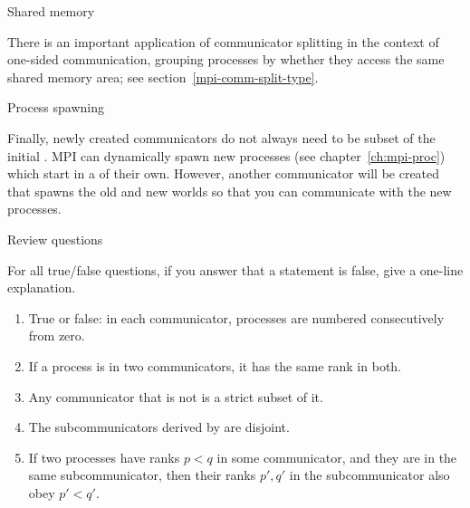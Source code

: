  {Shared memory}

There is an important application of communicator splitting in the
context of one-sided communication, grouping processes by whether they
access the same shared memory area; see section~\ref{mpi-comm-split-type}.

 {Process spawning}

Finally, newly created communicators do not always need to be subset
of the initial .
MPI can dynamically spawn new processes (see chapter~\ref{ch:mpi-proc})
which start in a  of their own.
However, another communicator will be created that spawns the old and new worlds
so that you can communicate with the new processes.







\newpage
{} {Review questions}

For all true/false questions, if you answer that a statement is false,
give a one-line explanation.

\begin{enumerate}

\item True or false: in each communicator, processes are numbered consecutively from zero.

\item If a process is in two communicators, it has the same rank in
both.

\item Any communicator that is not  is a strict subset of it.

\item The subcommunicators derived by 
  are disjoint.

\item If two processes have ranks $p<q$ in some communicator,
  and they are in the same subcommunicator,
  then their ranks $p',q'$ in the subcommunicator also obey $p'<q'$.
\end{enumerate}




